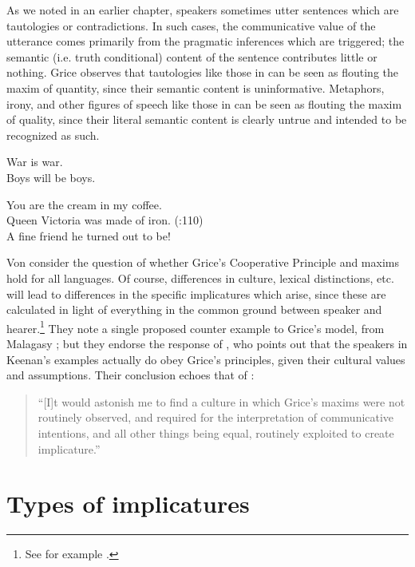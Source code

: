 As we noted in an earlier chapter, speakers sometimes utter sentences which are tautologies or contradictions. In such cases, the communicative value of the utterance comes primarily from the pragmatic inferences which are triggered; the semantic (i.e. truth conditional) content of the sentence contributes little or nothing. Grice observes that tautologies like those in  can be seen as flouting the maxim of quantity, since their semantic content is uninformative. Metaphors, irony, and other figures of speech like those in  can be seen as flouting the maxim of quality, since their literal semantic content is clearly untrue and intended to be recognized as such.


\ea \label{ex:8.12}
\ea War is war.\\
\ex Boys will be boys.
                       \z
\z

\ea \label{ex:8.13}
\ea You are the cream in my coffee.\\
\ex Queen Victoria was made of iron. (\citealt{Levinson1983}:110)\\
\ex A fine friend he turned out to be!
                       \z
\z


Von \citet{FintelMatthewson2008} consider the question of whether Grice’s Cooperative Principle and maxims hold for all languages. Of course, differences in culture, lexical distinctions, etc. will lead to differences in the specific implicatures which arise, since these are calculated in light of everything in the common ground between speaker and hearer.\footnote{See for example \citet{Matsumoto1995}.} They note a single proposed counter example to Grice’s model, from Malagasy \citep{Keenan1974}; but they endorse the response of \citet{Prince1982}, who points out that the speakers in Keenan’s examples actually do obey Grice’s principles, given their cultural values and assumptions. Their conclusion echoes that of \citet[419]{Green1990}:


\begin{quote}
“[I]t would astonish me to find a culture in which Grice’s maxims were not routinely observed, and required for the interpretation of communicative intentions, and all other things being equal, routinely exploited to create implicature.”
\end{quote}

\section{Types of implicatures}\label{sec:} %
